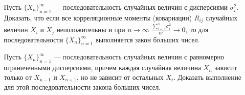 \begin{problem}
Пусть $\{ X_n\}_{n=1}^{\infty}$ --- последовательность случайных величин с дисперсиями $\sigma_i^2$. Доказать, что если все 
корреляционные моменты (ковариации) $R_{ij}$ случайных величин $X_i$ и $X_j$ неположительны и при $n\to\infty$ 
$\frac{\sum\limits_{i=1}^{n} \sigma_i^2}{n^2}\to 0$, то для последовательности $\{ X_n\}_{n=1}^{\infty}$ выполняется закон больших чисел. 
\end{problem}

\begin{problem}
Пусть $\{ X_n\}_{n=1}^{\infty}$ --- последовательность случайных величин с равномерно ограниченными дисперсиями, причем каждая 
случайная величина $X_n$ зависит только от $X_{n-1}$ и $X_{n+1}$, но не зависит от остальных $X_i$. Доказать выполнение для этой 
последовательности закона больших чисел.
\end{problem}
